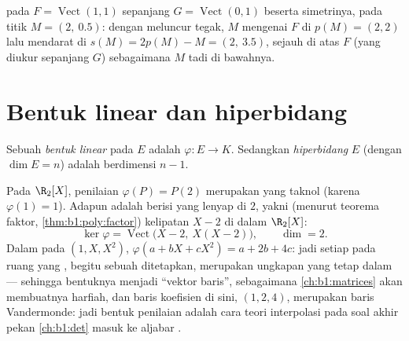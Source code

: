 \begin{omfigure}

{\small {} pada $F = \operatorname{Vect}(1,1)$ sepanjang
$G = \operatorname{Vect}(0,1)$ beserta simetrinya, pada titik $M
= (2,\ 0.5)$: dengan meluncur tegak, $M$ mengenai $F$ di $p(M) = (2,2)$
lalu mendarat di $s(M) = 2p(M) - M = (2,\ 3.5)$, sejauh di atas $F$
(yang diukur sepanjang $G$) sebagaimana $M$ tadi di bawahnya.}
\end{omfigure}

\section{Bentuk linear dan hiperbidang}

\begin{definition}\label{def:b1:linmaps:forms}
Sebuah \emph{bentuk linear} pada $E$ adalah 
$\varphi \colon E \to K$. Sedangkan \emph{hiperbidang}
$E$ (dengan $\dim E = n$) adalah  berdimensi $n - 1$.
\end{definition}

\begin{example}
\label{ex:b1:linmaps:evaluationform}
Pada $\R_2[X]$, penilaian $\varphi(P) = P(2)$ merupakan  yang taknol (karena $\varphi(1) = 1$). Adapun  adalah 
berisi  yang lenyap di $2$, yakni (menurut teorema faktor,
\cref{thm:b1:poly:factor}) kelipatan $X - 2$ di dalam
$\R_2[X]$:
\[
\ker\varphi = \operatorname{Vect}\bigl(X - 2,\ X(X - 2)\bigr),
\qquad \dim = 2 .
\]
Dalam  pada $(1, X, X^2)$, $\varphi(a + bX + cX^2) = a +
2b + 4c$: jadi setiap  pada ruang yang ,
begitu sebuah  ditetapkan, merupakan ungkapan  yang tetap dalam
 --- sehingga bentuknya menjadi ``vektor baris'', sebagaimana
\cref{ch:b1:matrices} akan membuatnya harfiah, dan baris koefisien
di sini, $(1, 2, 4)$, merupakan baris Vandermonde: jadi bentuk penilaian
adalah cara teori interpolasi pada soal akhir pekan \cref{ch:b1:det}
masuk ke aljabar .
\end{example}

